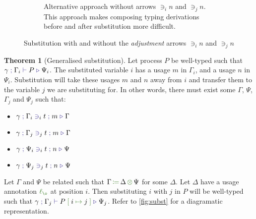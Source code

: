 \documentclass[a4paper,UKenglish,cleveref,autoref,thm-restate,authorcolumns]{lipics-v2019}
\theoremstyle{definition}
\newtheorem{nitheorem}{Theorem}
\newcommand{\type}[1]{\textcolor{BlueViolet}{\operatorname{#1}}}
\newcommand{\func}[1]{\textcolor{OliveGreen}{\operatorname{#1}}}
\newcommand{\subst}[3]{#1 \; \func{[} \; #3 \; \func{\mapsto} \;#2 \; \func{]}}
\newcommand{\opctx}[3]{#1 \, \func{\coloneqq} \, #2 \, \func{\otimes} \, #3}
\newcommand{\lz}{\func{\ell_{\o}}}
\newcommand{\types}[4]{#1 \; \type{;} \; #2 \; \type{\vdash} \; #3 \; \type{\triangleright} \; #4}
\newcommand{\contains}[6]{#1 \; \type{;} \; #2 \; \type{\ni}_{#3} \; #4 \; \type{;} \; #5 \; \type{\triangleright} \; #6}
\begin{document}
\begin{figure}[h]
\begin{subfigure}{.4\textwidth}
    \caption{
      Alternative approach without arrows $\ni_i n$ and $\ni_j n$.
      This approach makes composing typing derivations before and after substitution more difficult.
    }
    \label{fig:subst-alternative}
  \end{subfigure}
  \caption{Substitution with and without the \emph{adjustment} arrows $\ni_i n$ and $\ni_j n$}
\end{figure}

\begin{nitheorem}[Generalised substitution]
  \label{thm:subst-generalization}
  Let process $P$ be well-typed such that $\types{\gamma}{\Gamma_i}{P}{\Psi_i}$.
  The substituted variable $i$ has a usage $m$ in $\Gamma_i$, and a usage $n$ in $\Psi_i$.
  Substitution will take these usages $m$ and $n$ away from $i$ and transfer them to the variable $j$ we are substituting for.
  In other words, there must exist some $\Gamma$, $\Psi$, $\Gamma_j$ and $\Psi_j$ such that:
  \begin{multicols}{2}
  \begin{itemize}
    \item $\contains{\gamma}{\Gamma_i}{i}{t}{m}{\Gamma}$
    \item $\contains{\gamma}{\Gamma_j}{j}{t}{m}{\Gamma}$
    \item $\contains{\gamma}{\Psi_i}{i}{t}{n}{\Psi}$
    \item $\contains{\gamma}{\Psi_j}{j}{t}{n}{\Psi}$
  \end{itemize}
  \end{multicols}
  Let $\Gamma$ and $\Psi$ be related such that $\opctx{\Gamma}{\Delta}{\Psi}$ for some $\Delta$.
  Let $\Delta$ have a usage annotation $\lz$ at position $i$.
  Then substituting $i$ with $j$ in $P$ will be well-typed such that $\types{\gamma}{\Gamma_j}{\subst{P}{j}{i}}{\Psi_j}$.
  Refer to \autoref{fig:subst} for a diagramatic representation.
\end{nitheorem}
\end{document}
